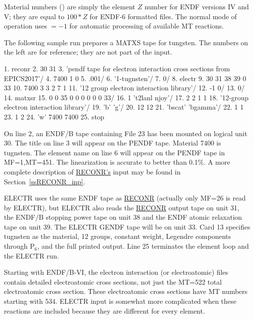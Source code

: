 Material numbers () are simply the element $Z$ number
for ENDF versions IV and V;  they are equal to $100{*}Z$ for
ENDF-6 formatted files. The normal mode of operation uses
$=-1$ for automatic processing of available MT reactions.

The following sample run prepares a MATXS tape for tungsten.
The numbers on the left are for reference; they are not part of the input.

\small
\begin{ccode}

  1.   reconr
  2.   30 31
  3.   'pendf tape for electron interaction cross sections from EPICS2017'/
  4.   7400 1 0
  5.   .001/
  6.   '1-tugnsten'/
  7.   0/
  8.   electr
  9.   30 31 38 39 0 33
 10.   7400 3 3 2 7 1
 11.   '12 group electron interaction library'/
 12.   -1 0/
 13.   0/
 14.   matxsr
 15.   0  0 35  0  0  0  0  0  0 33/
 16.   1 't2lanl njoy'/
 17.   2 2 1 1
 18.   '12-group electron interaction library'/
 19.   'b' 'g'/
 20.   12 12
 21.   'bscat' 'bgamma'/
 22.   1 1
 23.   1 2
 24.   'w' 7400 7400
 25.   stop

\end{ccode}
\normalsize

On line 2, an ENDF/B tape containing File 23 has been
mounted on logical unit 30. The title on line 3 will appear on the PENDF
tape. Material 7400 is tugnsten. The element name on line 6 will
appear on the PENDF tape in MF=1,MT=451. The linearization is accurate to
better than 0.1\%.  A more complete description of
\hyperlink{sRECONRhy}{RECONR's} input may be found in
Section~\ref{ssRECONR_inp}.

ELECTR uses the same ENDF tape as \hyperlink{sRECONRhy}{RECONR}
(actually only MF=26 is read by ELECTR), but ELECTR also reads the
\hyperlink{sRECONRhy}{RECONR} output tape on unit 31, the ENDF/B stopping
power tape on unit 38 and the ENDF atomic relaxation tape on unit 39.
The ELECTR GENDF tape will be on unit 33. Card 13 specifies tugnsten
as the material, 12 groups, constant weight, Legendre components
through P$_6$, and the full printed output. Line 25 terminates
the element loop and the ELECTR run.

Starting with ENDF/B-VI, the electron interaction (or electroatomic)
files contain detailed electroatomic cross sections, not just
the MT=522 total electroatomic cross section.  These electroatomic
cross sections have MT numbers starting with 534. ELECTR input is
somewhat more complicated when these reactions are included because
they are different for every element.

